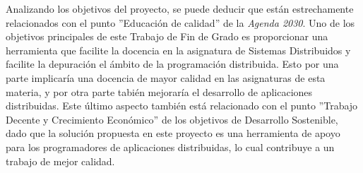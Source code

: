 Analizando los objetivos del proyecto, se puede deducir que están estrechamente relacionados con el punto ''Educación de calidad'' de la \textit{Agenda 2030}. Uno de los objetivos principales de este Trabajo de Fin de Grado es proporcionar una herramienta que facilite la docencia en la asignatura de Sistemas Distribuidos y facilite la depuración el ámbito de la programación distribuida. Esto por una parte implicaría una docencia de mayor calidad en las asignaturas de esta materia, y por otra parte tabién mejoraría el desarrollo de aplicaciones distribuidas. Este último aspecto también está relacionado con el punto ''Trabajo Decente y Crecimiento Económico'' de los objetivos de Desarrollo Sostenible, dado que la solución propuesta en este proyecto es una herramienta de apoyo para los programadores de aplicaciones distribuidas, lo cual contribuye a un trabajo de mejor calidad.
